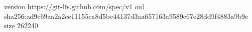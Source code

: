 version https://git-lfs.github.com/spec/v1
oid sha256:ad9c69aa2a2ce11155ca8d5bc44137d3aa657163a9589c67e28dd9f4883a9b9e
size 262240
